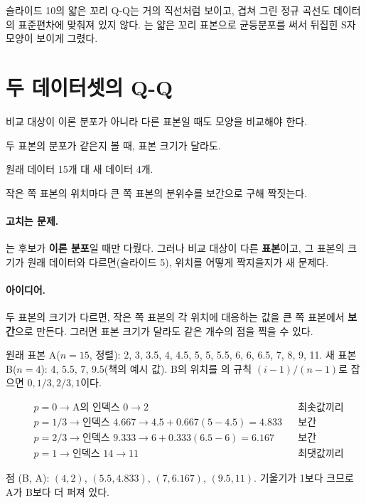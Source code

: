 \begin{pitfall}
슬라이드 10의 얇은 꼬리 Q-Q는 거의 직선처럼 보이고,
겹쳐 그린 정규 곡선도 데이터의 표준편차에 맞춰져 있지 않다.
는 얇은 꼬리 표본으로 균등분포를 써서 뒤집힌 S자
모양이 보이게 그렸다.
\end{pitfall}

\section{두 데이터셋의 Q-Q}
\label{sec:qq-two-samples}

\begin{inbrief}
  \item[Why] 비교 대상이 이론 분포가 아니라 다른 표본일 때도 모양을
             비교해야 한다.
  \item[When] 두 표본의 분포가 같은지 볼 때, 표본 크기가 달라도.
  \item[Where] 원래 데이터 15개 대 새 데이터 4개.
  \item[How] 작은 쪽 표본의 위치마다 큰 쪽 표본의 분위수를 보간으로 구해
             짝짓는다.
\end{inbrief}

\paragraph{고치는 문제.} 는 후보가 \textbf{이론 분포}일 때만
다뤘다. 그러나 비교 대상이 다른 \textbf{표본}이고, 그 표본의 크기가 원래
데이터와 다르면(슬라이드 5), 위치를 어떻게 짝지을지가 새 문제다.

\paragraph{아이디어.} 두 표본의 크기가 다르면, 작은 쪽 표본의 각 위치에
대응하는 값을 큰 쪽 표본에서 \textbf{보간}으로 만든다. 그러면 표본 크기가
달라도 같은 개수의 점을 찍을 수 있다.

\begin{example}[크기가 다른 두 표본]
\label{ex:qq-two-samples}
원래 표본 A($n=15$, 정렬): 2, 3, 3.5, 4, 4.5, 5, 5, 5.5, 6, 6, 6.5, 7, 8,
9, 11. 새 표본 B($n=4$): 4, 5.5, 7, 9.5(책의 예시 값). B의 위치를
의 규칙 $(i-1)/(n-1)$로 잡으면 $0, 1/3, 2/3, 1$이다.

\begin{align*}
  &p = 0 \to \text{A의 인덱스 } 0 \to 2 && \text{최솟값끼리}\\
  &p = 1/3 \to \text{인덱스 } 4.667 \to 4.5 + 0.667(5{-}4.5) = 4.833 && \text{보간}\\
  &p = 2/3 \to \text{인덱스 } 9.333 \to 6 + 0.333(6.5{-}6) = 6.167 && \text{보간}\\
  &p = 1 \to \text{인덱스 } 14 \to 11 && \text{최댓값끼리}
\end{align*}

점 (B, A): $(4, 2)$, $(5.5, 4.833)$, $(7, 6.167)$, $(9.5, 11)$. 기울기가
1보다 크므로 A가 B보다 더 퍼져 있다.
\end{example}

